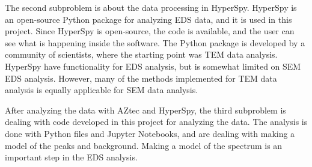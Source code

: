 \begin{center}
    \vspace*{0.2cm}

    \vspace*{0.2cm}
\end{center}



The second subproblem is about the data processing in HyperSpy.
HyperSpy is an open-source Python package for analyzing EDS data, and it is used in this project.
Since HyperSpy is open-source, the code is available, and the user can see what is happening inside the software.
The Python package is developed by a community of scientists, where the starting point was TEM data analysis.
HyperSpy have functionality for EDS analysis, but is somewhat limited on SEM EDS analysis.
However, many of the methods implemented for TEM data analysis is equally applicable for SEM data analysis.

\begin{center}
    \vspace*{0.2cm}

    \vspace*{0.2cm}
\end{center}




After analyzing the data with AZtec and HyperSpy, the third subproblem is dealing with code developed in this project for analyzing the data.
The analysis is done with Python files and Jupyter Notebooks, and are dealing with making a model of the peaks and background.
Making a model of the spectrum is an important step in the EDS analysis.

